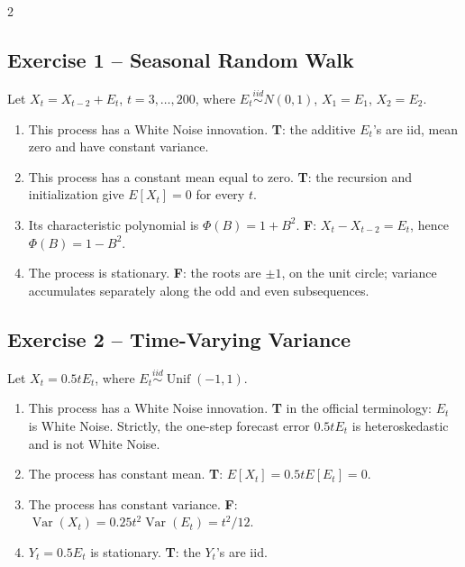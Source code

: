 \documentclass[9pt,a4paper]{extarticle}
\begin{document}
\begin{multicols}{2}
\subsection*{Exercise 1 -- Seasonal Random Walk}
Let \(X_t=X_{t-2}+E_t\), \(t=3,\ldots,200\), where \(E_t\stackrel{iid}{\sim}N(0,1)\), \(X_1=E_1\), \(X_2=E_2\).
\begin{enumerate}[label=\alph*),leftmargin=4mm]
\item This process has a White Noise innovation. \textbf{T}: the additive \(E_t\)'s are iid, mean zero and have constant variance.
\item This process has a constant mean equal to zero. \textbf{T}: the recursion and initialization give \(E[X_t]=0\) for every \(t\).
\item Its characteristic polynomial is \(\Phi(B)=1+B^2\). \textbf{F}: \(X_t-X_{t-2}=E_t\), hence \(\Phi(B)=1-B^2\).
\item The process is stationary. \textbf{F}: the roots are \(\pm1\), on the unit circle; variance accumulates separately along the odd and even subsequences.
\end{enumerate}

\subsection*{Exercise 2 -- Time-Varying Variance}
Let \(X_t=0.5tE_t\), where \(E_t\stackrel{iid}{\sim}\operatorname{Unif}(-1,1)\).
\begin{enumerate}[label=\alph*),leftmargin=4mm]
\item This process has a White Noise innovation. \textbf{T} in the official terminology: \(E_t\) is White Noise. Strictly, the one-step forecast error \(0.5tE_t\) is heteroskedastic and is not White Noise.
\item The process has constant mean. \textbf{T}: \(E[X_t]=0.5tE[E_t]=0\).
\item The process has constant variance. \textbf{F}: \(\operatorname{Var}(X_t)=0.25t^2\operatorname{Var}(E_t)=t^2/12\).
\item \(Y_t=0.5E_t\) is stationary. \textbf{T}: the \(Y_t\)'s are iid.
\end{enumerate}


\end{multicols}
\end{document}

